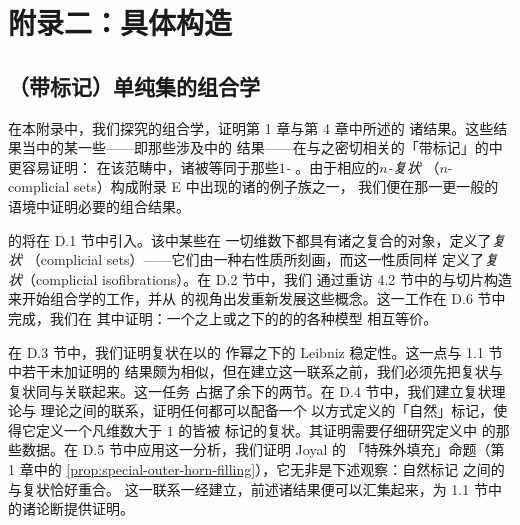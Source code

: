 \part*{附录二：具体构造}
\chapter{（带标记）单纯集的组合学}\label{ch:marked-simplicial-sets}


在本附录中，我们探究\trSimplicialSet{}的组合学，证明第 1 章与第 4 章中所述的%
诸结果。这些结果当中的某一些——即那些涉及\trQuasiCategory{}中\trIsomorphism{}的%
结果——在与之密切相关的「带标记」\trSimplicialSet{}的\trCategory{}中更容易证明：
在该范畴中，诸\trQuasiCategory{}被等同于那些\emph{$1$-\trComplicial}%
\trMarkedSimplicialSet。由于相应的\emph{$n$-复状\trSimplicialSet}%
（$n$-complicial sets）构成附录 E 中出现的诸\trInfinityCosmos{}的例子族之一，
我们便在那一更一般的语境中证明必要的组合结果。

\trMarkedSimplicialSet{}的\trCategory{}将在 D.1 节中引入。该\trCategory{}中某些在%
一切维数下都具有诸\trSimplex{}之复合的对象，定义了\emph{复状\trSimplicialSet}%
（complicial sets）——它们由一种右\trLifting{}性质所刻画，而这一性质同样%
定义了\emph{复状\trIsofibration}（complicial isofibrations）。在 D.2 节中，我们%
通过重访 4.2 节中的\trJoin{}与切片构造来开始组合学的工作，并从\trAugmented{}%
\trSimplicialSet{}的视角出发重新发展这些概念。这一工作在 D.6 节中完成，我们在%
其中证明：一个\trDiagram{}之上或之下的\trCone{}的\trQuasiCategory{}的各种模型%
相互等价。

在 D.3 节中，我们证明复状\trIsofibration{}在以\trMarkedSimplicialSet{}的%
\trMonomorphism{}作幂之下的 Leibniz 稳定性。这一点与 1.1 节中若干未加证明的%
结果颇为相似，但在建立这一联系之前，我们必须先把复状\trSimplicialSet{}与%
复状\trIsofibration{}同\trQuasiCategory{}与\trIsofibration{}关联起来。这一任务%
占据了余下的两节。在 D.4 节中，我们建立复状\trSimplicialSet{}理论与%
\trQuasiCategory{}理论之间的联系，证明任何\trQuasiCategory{}都可以配备一个%
以\trCanonical{}方式定义的「自然」标记，使得它定义一个凡维数大于 $1$ 的\trSimplex{}皆被%
标记的复状\trSimplicialSet。其证明需要仔细研究定义\trQuasiCategory{}中%
\trIsomorphism{}的那些数据。在 D.5 节中应用这一分析，我们证明 Joyal 的%
「特殊外\trHorn{}填充」命题（第 1 章中的%
\cref{prop:special-outer-horn-filling}），它无非是下述观察：自然标记%
\trQuasiCategory{}之间的\trIsofibration{}与复状\trIsofibration{}恰好重合。%
这一联系一经建立，前述诸结果便可以汇集起来，为 1.1 节中的诸论断提供证明。

